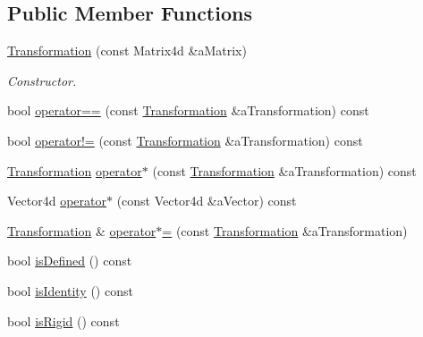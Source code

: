 \subsection*{Public Member Functions}
\begin{DoxyCompactItemize}
\item 
\hyperlink{classlibrary_1_1math_1_1geom_1_1d3_1_1_transformation_ac98131fb82e06d5d5ee3b9d5c8981834}{Transformation} (const Matrix4d \&a\+Matrix)
\begin{DoxyCompactList}\small\item\em Constructor. \end{DoxyCompactList}\item 
bool \hyperlink{classlibrary_1_1math_1_1geom_1_1d3_1_1_transformation_ad65ef7737c9299ae939585873a147800}{operator==} (const \hyperlink{classlibrary_1_1math_1_1geom_1_1d3_1_1_transformation}{Transformation} \&a\+Transformation) const
\item 
bool \hyperlink{classlibrary_1_1math_1_1geom_1_1d3_1_1_transformation_ac231beeb8ada73eada915903af7c56b1}{operator!=} (const \hyperlink{classlibrary_1_1math_1_1geom_1_1d3_1_1_transformation}{Transformation} \&a\+Transformation) const
\item 
\hyperlink{classlibrary_1_1math_1_1geom_1_1d3_1_1_transformation}{Transformation} \hyperlink{classlibrary_1_1math_1_1geom_1_1d3_1_1_transformation_ad2ac7373f1e8a55ca22da045a5853c18}{operator$\ast$} (const \hyperlink{classlibrary_1_1math_1_1geom_1_1d3_1_1_transformation}{Transformation} \&a\+Transformation) const
\item 
Vector4d \hyperlink{classlibrary_1_1math_1_1geom_1_1d3_1_1_transformation_a17ea83976590631f71837398fc59f1ac}{operator$\ast$} (const Vector4d \&a\+Vector) const
\item 
\hyperlink{classlibrary_1_1math_1_1geom_1_1d3_1_1_transformation}{Transformation} \& \hyperlink{classlibrary_1_1math_1_1geom_1_1d3_1_1_transformation_ae0b9940900e14241a1fb074ada53e344}{operator$\ast$=} (const \hyperlink{classlibrary_1_1math_1_1geom_1_1d3_1_1_transformation}{Transformation} \&a\+Transformation)
\item 
bool \hyperlink{classlibrary_1_1math_1_1geom_1_1d3_1_1_transformation_ac8d339a3e975939cf0ea37bbff0ba53d}{is\+Defined} () const
\item 
bool \hyperlink{classlibrary_1_1math_1_1geom_1_1d3_1_1_transformation_ac315d6665d1a589995b8ac3501edb668}{is\+Identity} () const
\item 
bool \hyperlink{classlibrary_1_1math_1_1geom_1_1d3_1_1_transformation_a21d2c767561d59c1fc53cdc254207971}{is\+Rigid} () const

\end{DoxyCompactItemize}
